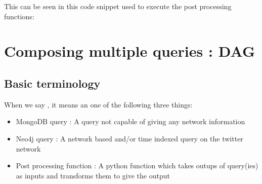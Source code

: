 \documentclass[letterpaper,10pt,english]{sphinxmanual}
\begin{document}
This can be seen in this code snippet used to execute the post processing functions:

%
\begin{sphinxVerbatim}[commandchars=\\\{\}]
  
         
       
        \PYG{p}{[}\PYG{p}{]}  \PYG{p}{[}\PYG{p}{]}
   
\end{sphinxVerbatim}


\chapter{Composing multiple queries : DAG}
\label{\detokenize{dag:composing-multiple-queries-dag}}\label{\detokenize{dag::doc}}

\section{Basic terminology}
\label{\detokenize{dag:basic-terminology}}
When we say , it means an one of the following three things:
\begin{itemize}
\item {} 
MongoDB query : A query not capable of giving any network information

\item {} 
Neo4j query : A network based and/or time indexed query on the twitter network

\item {} 
Post processing function : A python function which takes outups of query(ies) as inputs and transforms them to give the output

\end{itemize}
\end{document}

